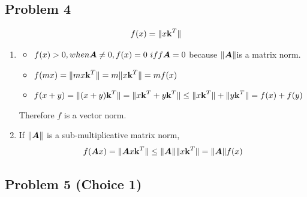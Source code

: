 \documentclass{article}
\begin{document}
\hypertarget{problem_4_prove_or_disprove_3}{}
\subsection*{{Problem 4}}
\label{problem_4_prove_or_disprove_3}
\begin{align}
f(x)=\|x\boldsymbol{\mathrm{k}}^T\|
\end{align}

\begin{enumerate}
\item 
\begin{itemize} 
	\item  $f(x)>0, when \mA\neq0, \\ f(x)=0\ iff \mA=0 $ because $\|\boldsymbol{A}\| $is a matrix norm. 
	\item  $f(mx) = \|mx\boldsymbol{\mathrm{k}}^T\| =m\|x\boldsymbol{\mathrm{k}}^T\| = mf(x) $ 
	\item $f(x+y) = \|(x+y)\boldsymbol{\mathrm{k}}^T\| = \|x\boldsymbol{\mathrm{k}}^T+y\boldsymbol{\mathrm{k}}^T\| \leq \|x\boldsymbol{\mathrm{k}}^T\|+\|y\boldsymbol{\mathrm{k}}^T\| = f(x)+f(y)$
\end{itemize}
Therefore $f$ is a vector norm. 

\item If $\|\boldsymbol{A}\|$ is a sub-multiplicative matrix norm, 
\begin{align}
f(\boldsymbol{A} x)=\|\boldsymbol{A} x\boldsymbol{\mathrm{k}}^T\| \leq \|\boldsymbol{A}\| \|x\boldsymbol{\mathrm{k}}^T\| = \|\boldsymbol{A}\| f(x) 
\end{align}
\end{enumerate}


\hypertarget{problem_5_prove_or_disprove_3}{}
\subsection*{{Problem 5  (Choice 1) }}
\label{problem_5_prove_or_disprove_3}
\end{document}
